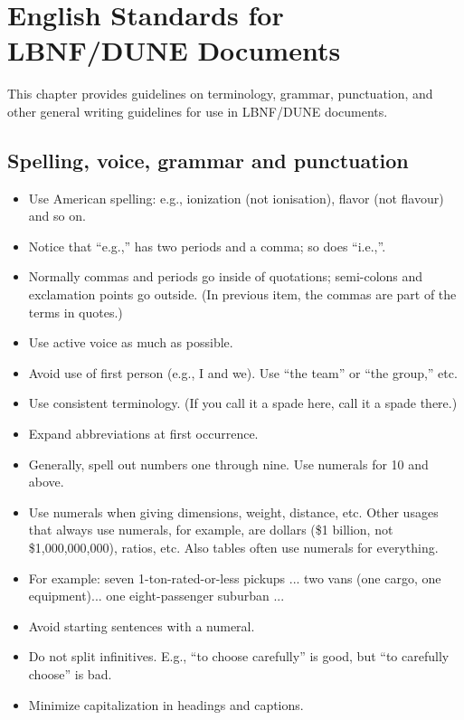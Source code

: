 \chapter{English Standards for LBNF/DUNE Documents}
\label{ch:latex-stds}

This chapter provides guidelines on terminology, grammar, punctuation, and other general writing guidelines for use in LBNF/DUNE documents. 


\section{Spelling, voice, grammar and punctuation}
\label{sec:spelling}

\begin{itemize}
\item Use American spelling: e.g., ionization (not ionisation), flavor (not flavour) and so on.
\item Notice that ``e.g.,'' has two periods and a comma; so does ``i.e.,''.
\item Normally commas and periods go inside of quotations;  semi-colons and exclamation points go outside.  (In previous item, the commas are part of the terms in quotes.)
\item Use active voice as much as possible. 
\item Avoid use of first person (e.g., I and we). Use ``the team'' or ``the group,'' etc.
\item Use consistent terminology. (If you call it a spade here, call it a spade there.)
\item Expand abbreviations at first occurrence.
\item Generally, spell out numbers one through nine. Use numerals for 10 and above.
\item Use numerals when giving dimensions, weight, distance, etc. Other usages that always use numerals, for example, are dollars (\$1 billion, not \$1,000,000,000), ratios, etc. Also tables often use numerals for everything.
\item For example: seven 1-ton-rated-or-less pickups ... two vans (one cargo, one equipment)... one eight-passenger suburban ...
\item Avoid starting sentences with a numeral.
\item Do not split infinitives. E.g., ``to choose carefully'' is good, but ``to carefully choose'' is bad.
\item Minimize capitalization in headings and captions.

\end{itemize}

